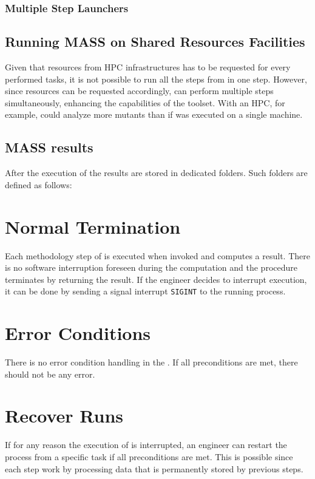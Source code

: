 \subsubsection{Multiple Step Launchers}
\label{sec:dama_launchers}

\subsection{Running MASS on Shared Resources Facilities}
\label{sec:dama_shared}

Given that resources from HPC infrastructures has to be requested for every performed tasks, it is not possible to run all the steps from \DAMA in one step.
However, since resources can be requested accordingly, \DAMA can perform multiple steps simultaneously, enhancing the capabilities of the toolset. With an HPC, for example, \DAMA could analyze more mutants than if \DAMA was executed on a single machine.

\subsection{MASS results}

After the execution of \DAMA the results are stored in dedicated folders. Such folders are defined as follows:


\section{Normal Termination}


Each methodology step of \DAMA is executed when invoked and computes a result. There is no software interruption foreseen during the computation and the procedure terminates by returning the result.
If the engineer decides to interrupt \DAMA execution, it can be done by sending a signal interrupt \texttt{SIGINT} to the running process.

\section{Error Conditions}


There is no error condition handling in the \FAQAS. If all preconditions are met, there should not be any error.

\section{Recover Runs}


If for any reason the execution of \DAMA is interrupted, an engineer can restart the process from a specific task if all preconditions are met. This is possible since each \DAMA step work by processing data that is permanently stored by previous steps.
